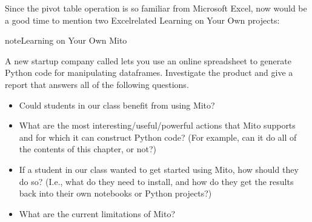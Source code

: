 \documentclass[letterpaper,10pt,english]{jupyterBook}
\begin{document}
\sphinxAtStartPar
Since the pivot table operation is so familiar from Microsoft Excel, now would be a good time to mention two Excel\sphinxhyphen{}related Learning on Your Own projects:

\begin{sphinxadmonition}{note}{Learning on Your Own \sphinxhyphen{} Mito}

\sphinxAtStartPar
A new startup company called  lets you use an online spreadsheet to generate Python code for manipulating dataframes.  Investigate the product and give a report that answers all of the following questions.
\begin{itemize}
\item {} 
\sphinxAtStartPar
Could students in our class benefit from using Mito?

\item {} 
\sphinxAtStartPar
What are the most interesting/useful/powerful actions that Mito supports and for which it can construct Python code?  (For example, can it do all of the contents of this chapter, or not?)

\item {} 
\sphinxAtStartPar
If a student in our class wanted to get started using Mito, how should they do so?  (I.e., what do they need to install, and how do they get the results back into their own notebooks or Python projects?)

\item {} 
\sphinxAtStartPar
What are the current limitations of Mito?

\end{itemize}
\end{sphinxadmonition}
\end{document}
